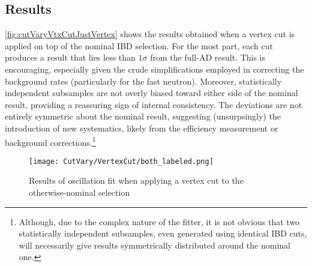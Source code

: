\documentclass[../thesis.tex]{subfiles}
\begin{document}
\subsection{Results}
\label{sec:cutVaryVtxCutResults}


\autoref{fig:cutVaryVtxCutJustVertex} shows the results obtained when a vertex cut is applied on top of the nominal IBD selection. For the most part, each cut produces a result that lies less than $1\sigma$ from the full-AD result. This is encouraging, especially given the crude simplifications employed in correcting the background rates (particularly for the fast neutron). Moreover, statistically independent subsamples are not overly biased toward either side of the nominal result, providing a reassuring sign of internal consistency. The deviations are not entirely symmetric about the nominal result, suggesting (unsurpsingly) the introduction of new systematics, likely from the efficiency measurement or background corrections.\footnote{Although, due to the complex nature of the fitter, it is not obvious that two statistically independent subsamples, even generated using identical IBD cuts, will necessarily give results symmetrically distributed around the nominal one.}

\begin{figure}[ht]
  \texttt{[image: CutVary/VertexCut/both\_labeled.png]}%
  \caption{Results of oscillation fit when applying a vertex cut to the otherwise-nominal selection}
  \label{fig:cutVaryVtxCutJustVertex}
\end{figure}
\end{document}
